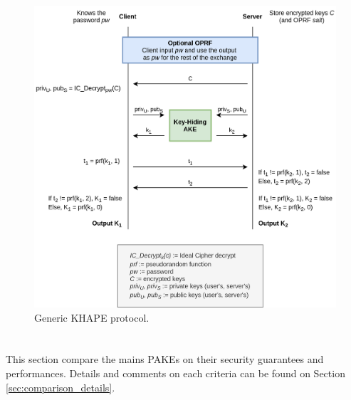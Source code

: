 \documentclass[../report.tex]{subfiles}
\begin{document}





\begin{figure}[h]
 \centering
 \includegraphics[width=\textwidth]{KHAPE.png}
 \caption{Generic KHAPE protocol.}
 \label{fig:Generic_KHAPE}
\end{figure}






\section{}

This section compare the mains PAKEs on their security guarantees and performances. Details and comments on each criteria can be found on Section \ref{sec:comparison_details}.
\end{document}

